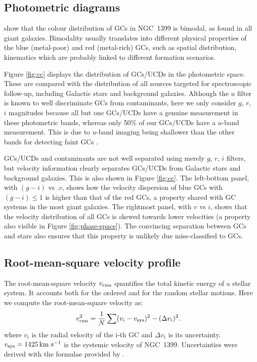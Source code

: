 \subsection{Photometric diagrams}

show that the colour distribution of GCs in NGC~1399 is bimodal, as found in 
all giant galaxies. Bimodality usually translates into different physical 
properties of the blue (metal-poor) and red (metal-rich) GCs, such as spatial 
distribution, kinematics which are probably linked to different formation 
scenarios. 

Figure \ref{fig:cc} displays the distribution of GCs/UCDs in the photometric 
space. These are compared with the distribution of all sources targeted for 
spectroscopic follow-up, including Galactic stars and background galaxies. 
Although the $u$ filter is known to well discriminate GCs from contaminants, 
here we only consider $g$, $r$, $i$ magnitudes because all but one GCs/UCDs 
have a genuine measurement in these photometric bands, whereas only 50\% of our 
GCs/UCDs have a $u$-band measurement. This is due to $u$-band imaging being 
shallower than the other bands for detecting faint GCs \citep{DAbrusco16}.

GCs/UCDs and contaminants are not well separated using merely $g$, $r$, $i$ 
filters, but velocity information clearly separates GCs/UCDs from Galactic 
stars and background galaxies. This is also shown in Figure \ref{fig:cc}. The 
left-bottom panel, with $(g-i)$ vs .$v$, shows how the velocity dispersion of 
blue GCs with $(g-i) \le 1$ is higher than that of the red GCs, a property 
shared with GC systems in the most giant galaxies. The rightmost panel, with 
$v$ vs $i$, shows that the velocity distribution of all GCs is skewed towards 
lower velocities (a property also visible in Figure \ref{fig:phase-space}). The 
convincing separation between GCs and stars also ensures that this property is 
unlikely due miss-classified to GCs. 

\subsection{Root-mean-square velocity profile}
The root-mean-square velocity $v_{\rm rms}$ quantifies the total kinetic energy 
of a stellar system. It accounts both for the ordered and for the random 
stellar motions. Here we compute the root-mean-square velocity as:
\begin{equation}
v_{\rm rms}^2 = \frac{1}{N}  \sum (v_i - v_{\rm sys})^2 - (\Delta v_i)^2 .
\label{eq:sigma}
\end{equation}
where $v_i$ is the radial velocity of the i-th GC and $\Delta v_i$ is its 
uncertainty. $v_{\rm sys}=1425 \mbox{\,km~s$^{-1}$}$ is the systemic velocity of NGC~1399. 
Uncertainties were derived with the formulae provided by \citet{Danese}. 

